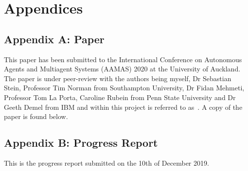 \chapter*{Appendices}
\section*{Appendix A: Paper} \label{app:aamas_paper} %
This paper has been submitted to the International Conference on Autonomous Agents and Multiagent Systems (AAMAS)
2020 at the University of Auckland. The paper is under peer-review with the authors being myself, Dr Sebastian Stein,
Professor Tim Norman from Southampton University, Dr Fidan Mehmeti, Professor Tom La Porta, Caroline Rubein from
Penn State University and Dr Geeth Demel from IBM and within this project is referred to
as~\cite{FlexibleResourceAllocation}. A copy of the paper is found below.










\section*{Appendix B: Progress Report} \label{app:progress_report}
This is the progress report submitted on the 10th of December 2019.

